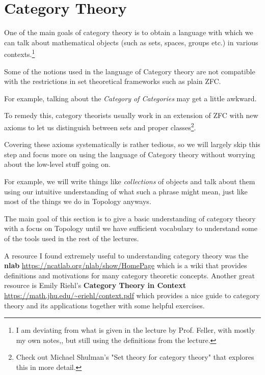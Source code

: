 \newpage
\section{Category Theory}

One of the main goals of category theory is to obtain a language with which we can talk about mathematical objects (such as sets, spaces, groups etc.) in various contexts.\footnote{I am deviating from what is given in the lecture by Prof. Feller, with mostly my own notes,, but still using the definitions from the lecture.}

Some of the notions used in the language of Category theory are not compatible with the restrictions in set theoretical frameworks such as plain ZFC.

For example, talking about the \emph{Category of Categories} may get a little awkward.

To remedy this, category theorists usually work in an extension of ZFC with new axioms to let us distinguish between sets and proper classes\footnote{Check out Michael Shulman's "Set theory for category theory" that explores this in more detail.}.

Covering these axioms systematically is rather tedious, so we will largely skip this step and focus more on using the language of Category theory without worrying about the low-level stuff going on.

For example, we will write things like \emph{collections} of objects and talk about them using our intuitive understanding of what such a phrase might mean, just like most of the things we do in Topology anyways.

The main goal of this section is to give a basic understanding of category theory with a focus on Topology until we have sufficient vocabulary to understand some of the tools used in the rest of the lectures.

A resource I found extremely useful to understanding category theory was the \textbf{nlab} \url{https://ncatlab.org/nlab/show/HomePage} which is a wiki that provides definitions and motivations for many category theoretic concepts.
Another great resource is Emily Riehl's \textbf{Category Theory in Context} \url{https://math.jhu.edu/~eriehl/context.pdf} which provides a nice guide to category theory and its applications together with some helpful exercises.

